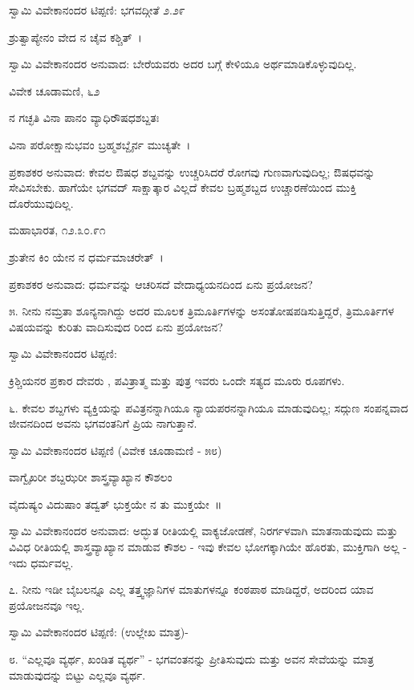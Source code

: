ಸ್ವಾಮಿ ವಿವೇಕಾನಂದರ ಟಿಪ್ಪಣಿ: ಭಗವದ್ಗೀತೆ ೨.೨೯

ಶ್ರುತ್ವಾಪ್ಯೇನಂ ವೇದ ನ ಚೈವ ಕಶ್ಚಿತ್~।

ಸ್ವಾಮಿ ವಿವೇಕಾನಂದರ ಅನುವಾದ: ಬೇರೆಯವರು ಅದರ ಬಗ್ಗೆ ಕೇಳಿಯೂ ಅರ್ಥಮಾಡಿಕೊಳ್ಳುವುದಿಲ್ಲ.

ವಿವೇಕ ಚೂಡಾಮಣಿ, ೬೨

ನ ಗಚ್ಛತಿ ವಿನಾ ಪಾನಂ ವ್ಯಾಧಿರೌಷಧಶಬ್ದತಃ

ವಿನಾ ಪರೋಕ್ಷಾನುಭವಂ ಬ್ರಹ್ಮಶಬ್ದೈರ್ನ ಮುಚ್ಯತೇ~।

ಪ್ರಕಾಶಕರ ಅನುವಾದ: ಕೇವಲ ಔಷಧ ಶಬ್ದವನ್ನು ಉಚ್ಚರಿಸಿದರೆ ರೋಗವು ಗುಣವಾಗುವುದಿಲ್ಲ; ಔಷಧವನ್ನು ಸೇವಿಸಬೇಕು. ಹಾಗೆಯೇ ಭಗವದ್ ಸಾಕ್ಷಾತ್ಕಾರ ವಿಲ್ಲದೆ ಕೇವಲ ಬ್ರಹ್ಮಶಬ್ದದ ಉಚ್ಚಾರಣೆಯಿಂದ ಮುಕ್ತಿ ದೊರೆಯುವುದಿಲ್ಲ.

ಮಹಾಭಾರತ, ೧೨.೩೦.೯೧

ಶ್ರುತೇನ ಕಿಂ ಯೇನ ನ ಧರ್ಮಮಾಚರೇತ್~।

ಪ್ರಕಾಶಕರ ಅನುವಾದ: ಧರ್ಮವನ್ನು ಆಚರಿಸದೆ ವೇದಾಧ್ಯಯನದಿಂದ ಏನು ಪ್ರಯೋಜನ?

೫. ನೀನು ನಮ್ರತಾ ಶೂನ್ಯನಾಗಿದ್ದು ಅದರ ಮೂಲಕ ತ್ರಿಮೂರ್ತಿಗಳನ್ನು ಅಸಂತೋಷಪಡಿಸುತ್ತಿದ್ದರೆ, ತ್ರಿಮೂರ್ತಿಗಳ ವಿಷಯವನ್ನು ಕುರಿತು ವಾದಿಸುವುದ ರಿಂದ ಏನು ಪ್ರಯೋಜನ? 

ಸ್ವಾಮಿ ವಿವೇಕಾನಂದರ ಟಿಪ್ಪಣಿ:

ಕ್ರಿಶ್ಚಿಯನರ ಪ್ರಕಾರ ದೇವರು , ಪವಿತ್ರಾತ್ಮ  ಮತ್ತು ಪುತ್ರ  ಇವರು ಒಂದೇ ಸತ್ಯದ ಮೂರು ರೂಪಗಳು.

೬. ಕೇವಲ ಶಬ್ದಗಳು ವ್ಯಕ್ತಿಯನ್ನು ಪವಿತ್ರನನ್ನಾಗಿಯೂ ನ್ಯಾಯಪರನನ್ನಾಗಿಯೂ ಮಾಡುವುದಿಲ್ಲ; ಸದ್ಗುಣ ಸಂಪನ್ನವಾದ ಜೀವನದಿಂದ ಅವನು ಭಗವಂತನಿಗೆ ಪ್ರಿಯ ನಾಗುತ್ತಾನೆ. 

ಸ್ವಾಮಿ ವಿವೇಕಾನಂದರ ಟಿಪ್ಪಣಿ (ವಿವೇಕ ಚೂಡಾಮಣಿ - ೫೮)

ವಾಗ್ವೈಖರೀ ಶಬ್ದಝರೀ ಶಾಸ್ತ್ರವ್ಯಾಖ್ಯಾನ ಕೌಶಲಂ

ವೈದುಷ್ಯಂ ವಿದುಷಾಂ ತದ್ವತ್ ಭುಕ್ತಯೇ ನ ತು ಮುಕ್ತಯೇ~॥

ಸ್ವಾಮಿ ವಿವೇಕಾನಂದರ ಅನುವಾದ: ಅದ್ಭುತ ರೀತಿಯಲ್ಲಿ ವಾಕ್ಯಜೋಡಣೆ, ನಿರರ್ಗಳವಾಗಿ ಮಾತನಾಡುವುದು ಮತ್ತು ವಿವಿಧ ರೀತಿಯಲ್ಲಿ ಶಾಸ್ತ್ರವ್ಯಾಖ್ಯಾನ ಮಾಡುವ ಕೌಶಲ - ಇವು ಕೇವಲ ಭೋಗಕ್ಕಾಗಿಯೇ ಹೊರತು, ಮುಕ್ತಿಗಾಗಿ ಅಲ್ಲ - ಇದು ಧರ್ಮವಲ್ಲ.

೭. ನೀನು ಇಡೀ ಬೈಬಲನ್ನೂ ಎಲ್ಲ ತತ್ತ್ವಜ್ಞಾನಿಗಳ ಮಾತುಗಳನ್ನೂ ಕಂಠಪಾಠ ಮಾಡಿದ್ದರೆ, ಅದರಿಂದ ಯಾವ ಪ್ರಯೋಜನವೂ ಇಲ್ಲ. 

ಸ್ವಾಮಿ ವಿವೇಕಾನಂದರ ಟಿಪ್ಪಣಿ: (ಉಲ್ಲೇಖ ಮಾತ್ರ)- 

೮. “ಎಲ್ಲವೂ ವ್ಯರ್ಥ, ಖಂಡಿತ ವ್ಯರ್ಥ”  - ಭಗವಂತನನ್ನು ಪ್ರೀತಿಸುವುದು ಮತ್ತು ಅವನ ಸೇವೆಯನ್ನು ಮಾತ್ರ ಮಾಡುವುದನ್ನು ಬಿಟ್ಟು ಎಲ್ಲವೂ ವ್ಯರ್ಥ. 

